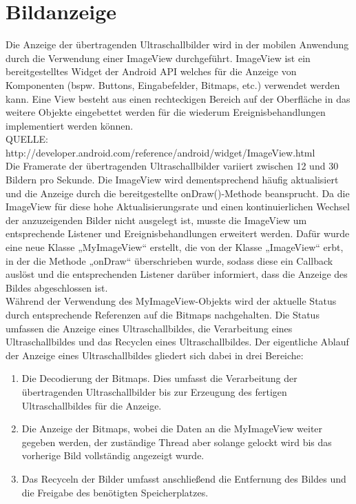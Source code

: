 \section{Bildanzeige}
Die Anzeige der übertragenden Ultraschallbilder wird in der mobilen Anwendung durch die Verwendung einer ImageView durchgeführt. ImageView ist ein bereitgestelltes Widget der Android API welches für die Anzeige von Komponenten (bspw. Buttons, Eingabefelder, Bitmaps, etc.) verwendet werden kann. Eine View besteht aus einen rechteckigen Bereich auf der Oberfläche in das weitere Objekte eingebettet werden für die wiederum Ereignisbehandlungen implementiert werden können. \\
QUELLE: http://developer.android.com/reference/android/widget/ImageView.html   \\
Die Framerate der übertragenden Ultraschallbilder variiert zwischen 12 und 30 Bildern pro Sekunde. Die ImageView wird dementsprechend häufig aktualisiert und die Anzeige durch die bereitgestellte onDraw()-Methode beansprucht. Da die ImageView für diese hohe Aktualisierungsrate und einen kontinuierlichen Wechsel der anzuzeigenden Bilder nicht ausgelegt ist, musste die ImageView um entsprechende Listener und Ereignisbehandlungen erweitert werden. 
Dafür wurde eine neue Klasse „MyImageView“ erstellt, die von der Klasse „ImageView“ erbt, in der die Methode „onDraw“ überschrieben wurde, sodass diese ein Callback auslöst und die entsprechenden Listener darüber informiert, dass die Anzeige des Bildes abgeschlossen ist. \\
Während der Verwendung des MyImageView-Objekts wird der aktuelle Status durch entsprechende Referenzen auf die Bitmaps  nachgehalten. Die Status umfassen die Anzeige eines Ultraschallbildes, die Verarbeitung eines Ultraschallbildes und das Recyclen eines Ultraschallbildes. Der eigentliche Ablauf der Anzeige eines Ultraschallbildes gliedert sich dabei in drei Bereiche:

\begin{minipage}{\textwidth}
\begin{enumerate}
\item Die Decodierung der Bitmaps. Dies umfasst die Verarbeitung der übertragenden Ultraschallbilder bis zur Erzeugung des fertigen Ultraschallbildes für die Anzeige.
\item Die Anzeige der Bitmaps, wobei die Daten an die MyImageView weiter gegeben werden, der zuständige Thread aber solange gelockt wird bis das vorherige Bild vollständig angezeigt wurde. 
\item Das Recyceln der Bilder umfasst anschließend die Entfernung des Bildes und die Freigabe des benötigten Speicherplatzes. 
\end{enumerate}
\end{minipage}
